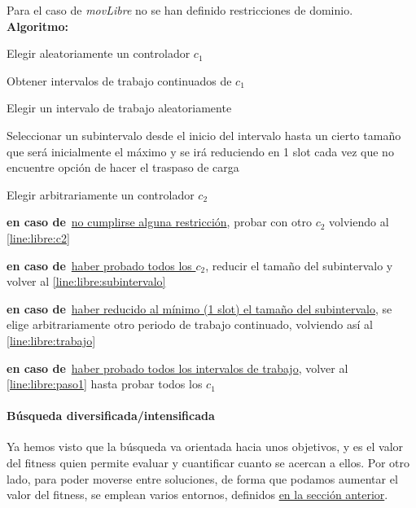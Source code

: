 Para el caso de \textit{movLibre} no se han definido restricciones de dominio.
\newpage
\textbf{Algoritmo:}
\SetAlgoNoLine
\LinesNumbered
\SetAlgoNoEnd
\DontPrintSemicolon
\begin{algorithm}[h]
    \label{algoritmo:movLibre}
    \SetAlgoNoEnd
    Elegir aleatoriamente un controlador $c_1$  \label{line:libre:paso1}\;
    \algovspace

    Obtener intervalos de trabajo continuados de $c_1$\;
    \algovspace

    Elegir un intervalo de trabajo aleatoriamente \label{line:libre:trabajo}\;
    \algovspace

    Seleccionar un subintervalo desde el inicio del intervalo hasta un cierto tamaño que será inicialmente el máximo y se irá reduciendo en 1 slot cada vez que no encuentre opción de hacer el traspaso de carga \label{line:libre:subintervalo}\;
    \algovspace

    Elegir arbitrariamente un controlador $c_2$ \label{line:libre:c2}\;
    \algovspace

    \algovspace

    \textbf{en caso de\,} \underline{no cumplirse alguna restricción}, probar con otro $c_2$ volviendo al \autoref{line:libre:c2}\;
    \algovspace

    \textbf{en caso de\,} \underline{haber probado todos los $c_2$}, reducir el tamaño del subintervalo y volver al \autoref{line:libre:subintervalo}\;
    \algovspace

    \textbf{en caso de\,} \underline{haber reducido al mínimo (1 slot) el tamaño del subintervalo}, se elige arbitrariamente otro periodo de trabajo continuado, volviendo así al \autoref{line:libre:trabajo}\;
    \algovspace

    \textbf{en caso de\,} \underline{haber probado todos los intervalos de trabajo}, volver al \autoref{line:libre:paso1} hasta probar todos los $c_1$\;
    \algovspace
\end{algorithm}


\paragraph{Búsqueda diversificada/intensificada} \label{capitulo:3:busqueda-divers-intens}
Ya hemos visto que la búsqueda va orientada hacia unos objetivos, y es el valor del fitness quien permite evaluar y cuantificar cuanto se acercan a ellos. Por otro lado, para poder moverse entre soluciones, de forma que podamos aumentar
el valor del fitness, se emplean varios entornos, definidos \hyperref[paragraph:entornos]{en la sección anterior}.

